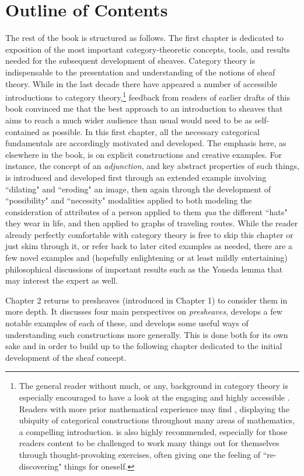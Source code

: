 \documentclass[a4paper]{book}
\theoremstyle{definition}
\theoremstyle{definition}
\theoremstyle{definition}
\theoremstyle{theorem}
\theoremstyle{definition}
\begin{document}
	\section{Outline of Contents}   
	The rest of the book is structured as follows. The first chapter is dedicated to exposition of the most important category-theoretic concepts, tools, and results needed for the subsequent development of sheaves. Category theory is indispensable to the presentation and understanding of the notions of sheaf theory. While in the last decade there have appeared a number of accessible introductions to category theory,\footnote{The general reader without much, or any, background in category theory is especially encouraged to have a look at the engaging and highly accessible \cite{spivak_category_2014}. Readers with more prior mathematical experience may find \cite{riehl_category_2016}, displaying the ubiquity of categorical constructions throughout many areas of mathematics, a compelling introduction. \cite{lawvere_sets_2003} is also highly recommended, especially for those readers content to be challenged to work many things out for themselves through thought-provoking exercises, often giving one the feeling of ``re-discovering" things for oneself.} feedback from readers of earlier drafts of this book convinced me that the best approach to an introduction to sheaves that aims to reach a much wider audience than usual would need to be as self-contained as possible. In this first chapter, all the necessary categorical fundamentals are accordingly motivated and developed. The emphasis here, as elsewhere in the book, is on explicit constructions and creative examples. For instance, the concept of an \textit{adjunction}, and key abstract properties of such things, is introduced and developed first through an extended example involving ``dilating" and ``eroding" an image, then again through the development of ``possibility" and ``necessity" modalities applied to both modeling the consideration of attributes of a person applied to them \textit{qua} the different ``hats" they wear in life, and then applied to graphs of traveling routes. While the reader already perfectly comfortable with category theory is free to skip this chapter or just skim through it, or refer back to later cited examples as needed, there are a few novel examples and (hopefully enlightening or at least mildly entertaining) philosophical discussions of important results such as the Yoneda lemma that may interest the expert as well. \par 
	Chapter 2 returns to presheaves (introduced in Chapter 1) to consider them in more depth. It discusses four main perspectives on \textit{presheaves}, develops a few notable examples of each of these, and develops some useful ways of understanding such constructions more generally. This is done both for its own sake and in order to build up to the following chapter dedicated to the initial development of the sheaf concept.\par 
\end{document}

